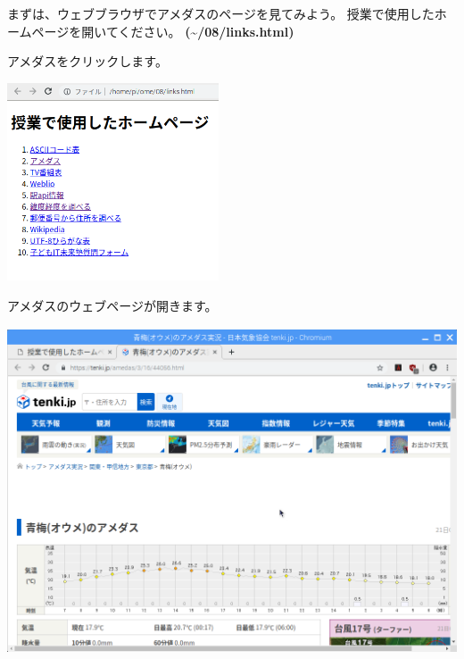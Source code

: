 \documentclass[a4paper,12pt,dvipdfmx]{jarticle}
\begin{document}
\bigskip

まずは、ウェブブラウザでアメダスのページを見てみよう。
授業で使用したホームページを開いてください。
\textbf{(\~{}/08/links.html)}

アメダスをクリックします。 



\begin{center}
\includegraphics[width=6.271cm,height=5.86cm]{textbook-img017.png}

\end{center}

\bigskip


\bigskip



アメダスのウェブページが開きます。

\begin{center}
\includegraphics[width=14.252cm,height=9.687cm]{textbook-img028.png}

\end{center}
\end{document}
